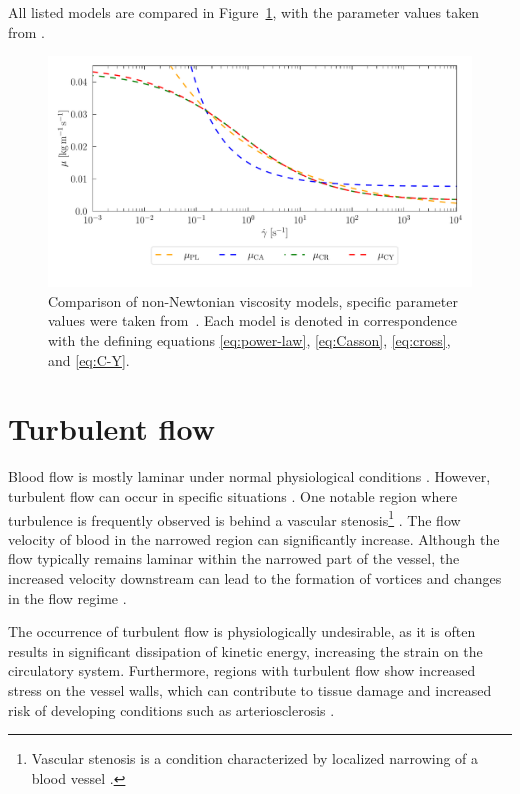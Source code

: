 All listed models are compared in Figure~\ref{fig:vs}, with the parameter values taken from \cite{Eichler2023}.
\begin{figure}[h]
	\centering
	\includegraphics[width=1.0\textwidth]{figures/modely.pdf}
	\caption{Comparison of non-Newtonian viscosity models, specific parameter values were taken from~\cite{Eichler2023}. Each model is denoted in correspondence with the defining equations
		\eqref{eq:power-law}, \eqref{eq:Casson}, \eqref{eq:cross}, and \eqref{eq:C-Y}.}
	\label{fig:vs}
\end{figure}

\section*{\fontsize{11}{15}\selectfont Turbulent flow}
Blood flow is mostly laminar under normal physiological conditions \cite{Sequeira}. However, turbulent flow can occur in specific situations \cite{Saqr2020}. One notable region where turbulence is frequently observed is behind a vascular stenosis\footnote{Vascular stenosis is a condition characterized by localized narrowing of a blood vessel \cite{Carabello2009}.} \cite{Jain2022}. The flow velocity of blood in the narrowed region can significantly increase. Although the flow typically remains laminar within the narrowed part of the vessel, the increased velocity downstream can lead to the formation of vortices and changes in the flow regime \cite{Sequeira, Saloner2019, Varghese2003}.

The occurrence of turbulent flow is physiologically undesirable, as it is often results in significant dissipation of kinetic energy, increasing the strain on the circulatory system. Furthermore, regions with turbulent flow show increased stress on the vessel walls, which can contribute to tissue damage and increased risk of developing conditions such as arteriosclerosis \cite{Saloner2019, Kameneva2004}.